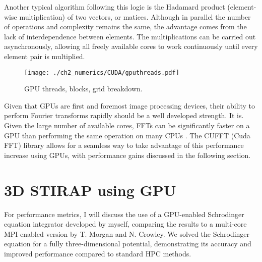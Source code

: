 Another typical algorithm following this logic is the Hadamard product (element-wise multiplication) of two vectors, or matices. Although in parallel the number of operations and complexity remains the same, the advantage comes from the lack of interdependence between elements. The multiplications can be carried out asynchronously, allowing all freely available cores to work continuously until every element pair is multiplied.

\begin{figure}
    \centering
    \texttt{[image: ./ch2\_numerics/CUDA/gputhreads.pdf]}
    \caption{GPU threads, blocks, grid breakdown.}
    \label{fig:gpu_threads}
\end{figure}

Given that GPUs are first and foremost image processing devices, their ability to perform Fourier transforms rapidly should be a well developed strength. It is. Given the large number of available cores, FFTs can be significantly faster on a GPU than performing the same operation on many CPUs \cite{AO:Morgan_ORiordan_pra_2013}. The CUFFT (Cuda FFT) library allows for a seamless way to take advantage of this performance increase using GPUs, with performance gains discussed in the following section.

\section{3D STIRAP using GPU}
For performance metrics, I will discuss the use of a GPU-enabled Schrodinger equation integrator developed by myself, comparing the results to a multi-core MPI enabled version by T. Morgan and N. Crowley. We solved the Schrodinger equation for a fully three-dimensional potential, demonstrating its accuracy and improved performance compared to standard HPC methods.
